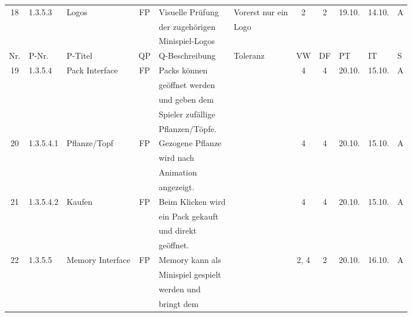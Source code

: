 \begin{longtable}{|c|l|l|c|l|l|c|c|l|l|l|}
            18 & 1.3.5.3 & Logos & FP & Visuelle Prüfung & Vorerst nur ein & 2 & 2 & 19.10. & 14.10. & A \\
            &       &            &    & der zugehörigen &  Logo &   & & & &\\
            &       &            &    & Minispiel-Logos &   &   & & & &\\[10ex]
            \hline
            \hline
            Nr. & P-Nr. & P-Titel & QP & Q-Beschreibung & Toleranz & VW & DF & PT & IT & S \\[0.5ex]
            \hline\hline
            \hline
            19 & 1.3.5.4 & Pack Interface & FP & Packs können &  & 4 & 4 & 20.10. & 15.10. & A \\
            &       &            &    & geöffnet werden &   &   & & & &\\
            &       &            &    & und geben dem &   &   & & & &\\
            &       &            &    & Spieler zufällige &   &   & & & &\\
            &       &            &    & Pflanzen/Töpfe. &   &   & & & &\\
            \hline
            20 & 1.3.5.4.1 & Pflanze/Topf & FP & Gezogene Pflanze &  & 4 & 4 & 20.10. & 15.10. & A \\
            &       &            &    & wird nach  &   &   & & & &\\
            &       &            &    & Animation &   &   & & & &\\
            &       &            &    & angezeigt. &   &   & & & &\\
            \hline
            21 & 1.3.5.4.2 & Kaufen & FP & Beim Klicken wird  &  & 4 & 4 & 20.10. & 15.10. & A \\
            &       &            &    & ein Pack gekauft &   &   & & & &\\
            &       &            &    & und direkt &   &   & & & &\\
            &       &            &    & geöffnet. &   &   & & & &\\
            \hline
            22 & 1.3.5.5 & Memory Interface & FP & Memory kann als &  & 2, 4 & 2 & 20.10. & 16.10. & A \\
            &       &            &    & Minispiel gespielt &   &   & & & &\\
            &       &            &    & werden und  &   &   & & & &\\
            &       &            &    & bringt dem  &   &   & & & &\\

\end{longtable}
